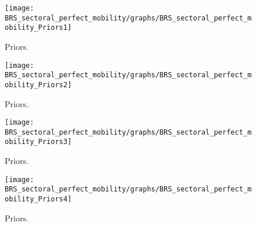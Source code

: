  
\begin{figure}[H]
\centering
\texttt{[image: BRS\_sectoral\_perfect\_mobility/graphs/BRS\_sectoral\_perfect\_mobility\_Priors1]}
\caption{Priors.}\label{Fig:Priors:1}
\end{figure}
\begin{figure}[H]
\centering
\texttt{[image: BRS\_sectoral\_perfect\_mobility/graphs/BRS\_sectoral\_perfect\_mobility\_Priors2]}
\caption{Priors.}\label{Fig:Priors:2}
\end{figure}
\begin{figure}[H]
\centering
\texttt{[image: BRS\_sectoral\_perfect\_mobility/graphs/BRS\_sectoral\_perfect\_mobility\_Priors3]}
\caption{Priors.}\label{Fig:Priors:3}
\end{figure}
\begin{figure}[H]
\centering
\texttt{[image: BRS\_sectoral\_perfect\_mobility/graphs/BRS\_sectoral\_perfect\_mobility\_Priors4]}
\caption{Priors.}\label{Fig:Priors:4}
\end{figure}
 
